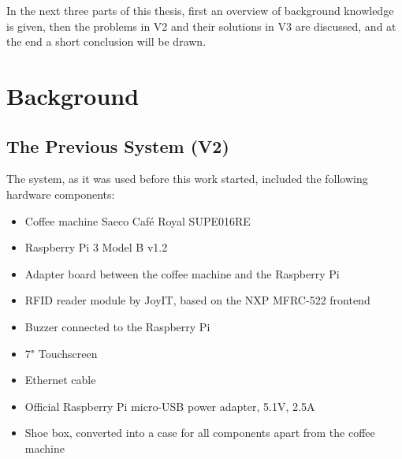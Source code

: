 \documentclass[12pt]{article}
\begin{document}
In the next three parts of this thesis,
first an overview of background knowledge is given,
then the problems in V2 and their solutions in V3 are discussed,
and at the end a short conclusion will be drawn.





\section{Background}

\subsection{The Previous System (V2)}
The system, as it was used before this work started, included the following hardware components:
\begin{itemize} 
  \item Coffee machine Saeco Café Royal SUPE016RE
  \item Raspberry Pi 3 Model B v1.2
  \item Adapter board between the coffee machine and the Raspberry Pi
  \item RFID reader module by JoyIT, based on the NXP MFRC-522 frontend
  \item Buzzer connected to the Raspberry Pi
  \item 7" Touchscreen
  \item Ethernet cable
  \item Official Raspberry Pi micro-USB power adapter, 5.1V, 2.5A
  \item Shoe box, converted into a case for all components apart from the coffee machine
\end{itemize}
\end{document}
